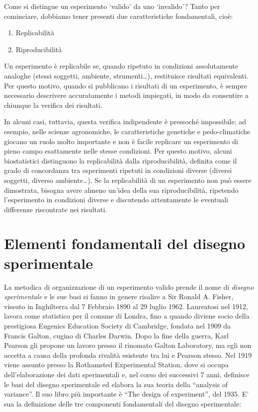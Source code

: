\documentclass[a4paper,12pt,oneside]{book}
\providecommand{\tightlist}{%
  \setlength{\itemsep}{0pt}\setlength{\parskip}{0pt}}
\begin{document}
Come si distingue un esperimento `valido' da uno `invalido'? Tanto per cominciare, dobbiamo tener presenti due caratteristiche fondamentali, cioè:

\begin{enumerate}
\def\labelenumi{\arabic{enumi}.}
\tightlist
\item
  Replicabilità
\item
  Riproducibilità
\end{enumerate}

Un esperimento è replicabile se, quando ripetuto in condizioni assolutamente analoghe (stessi soggetti, ambiente, strumenti\ldots{}), restituisce risultati equivalenti. Per questo motivo, quando si pubblicano i risultati di un esperimento, è sempre necessario descrivere accuratamente i metodi impiegati, in modo da consentire a chiunque la verifica dei risultati.

In alcuni casi, tuttavia, questa verifica indipendente è pressoché impossibile; ad esempio, nelle scienze agronomiche, le caratteristiche genetiche e pedo-climatiche giocano un ruolo molto importante e non è facile replicare un esperimento di pieno campo esattamente nelle stesse condizioni. Per questo motivo, alcuni biostatistici distinguono la replicabilità dalla riproducibilità, definita come il grado di concordanza tra esperimenti ripetuti in condizioni diverse (diversi soggetti, diverso ambiente\ldots{}). Se la replicabilità di un esperimento non può essere dimostrata, bisogna avere almeno un'idea della sua riproducibilità, ripetendo l'esperimento in condizioni diverse e discutendo attentamente le eventuali differenze riscontrate nei risultati.

\hypertarget{elementi-fondamentali-del-disegno-sperimentale}{%
\section{Elementi fondamentali del disegno sperimentale}\label{elementi-fondamentali-del-disegno-sperimentale}}

La metodica di organizzazione di un esperimento valido prende il nome di \emph{disegno sperimentale} e le sue basi si fanno in genere risalire a Sir Ronald A. Fisher, vissuto in Inghilterra dal 7 Febbraio 1890 al 29 luglio 1962. Laureatosi nel 1912, lavora come statistico per il comune di Londra, fino a quando diviene socio della prestigiosa Eugenics Education Society di Cambridge, fondata nel 1909 da Francis Galton, cugino di Charles Darwin. Dopo la fine della guerra, Karl Pearson gli propone un lavoro presso il rinomato Galton Laboratory, ma egli non accetta a causa della profonda rivalità esistente tra lui e Pearson stesso. Nel 1919 viene assunto presso la Rothamsted Experimental Station, dove si occupa dell'elaborazione dei dati sperimentali e, nel corso dei successivi 7 anni, definisce le basi del disegno sperimentale ed elabora la sua teoria della ``analysis of variance''. Il suo libro più importante è ``The design of experiment'', del 1935. E' sua la definizione delle tre componenti fondamentali del disegno sperimentale:
\end{document}
